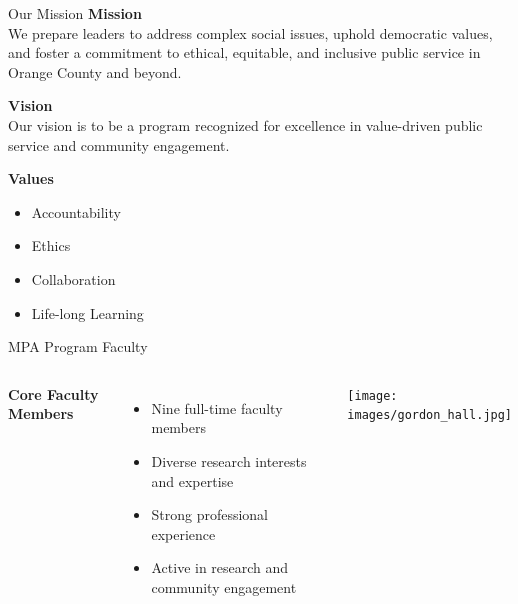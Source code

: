 \documentclass[10pt]{beamer}
\begin{document}
\begin{frame}{Our Mission}
    \textbf{Mission}\\
    We prepare leaders to address complex social issues, uphold democratic values, and foster a commitment to ethical, equitable, and inclusive public service in Orange County and beyond.
    
    \vspace{1em}
    
    \textbf{Vision}\\
    Our vision is to be a program recognized for excellence in value-driven public service and community engagement.
    
    \vspace{1em}
    
    \textbf{Values}
    \begin{itemize}
    \item Accountability
    \item Ethics
    \item Collaboration
    \item Life-long Learning
    \end{itemize}
\end{frame}

\begin{frame}{MPA Program Faculty}
    \begin{columns}[T]
    \textbf{Core Faculty Members}
    \begin{itemize}
    \item Nine full-time faculty members
    \item Diverse research interests and expertise
    \item Strong professional experience
    \item Active in research and community engagement
    \end{itemize}
    \texttt{[image: images/gordon\_hall.jpg]}
    \end{columns}
    \end{frame}
    
\end{document}
